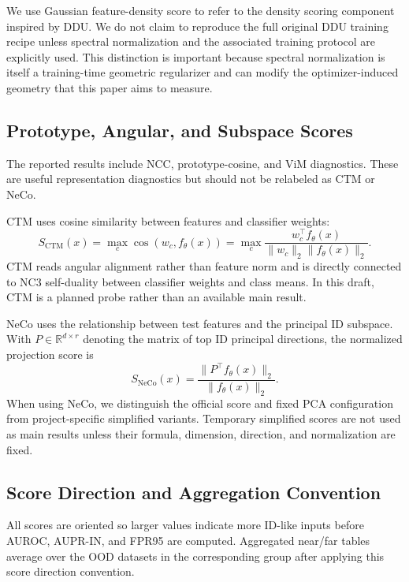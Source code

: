 We use Gaussian feature-density score to refer to the density scoring component
inspired by DDU. We do not claim to reproduce
the full original DDU training recipe unless spectral normalization and the
associated training protocol are explicitly used. This distinction is important
because spectral normalization is itself a training-time geometric regularizer
and can modify the optimizer-induced geometry that this paper aims to measure.

\subsection{Prototype, Angular, and Subspace Scores}
\label{app:prototype-angular-subspace-scores}

The reported results include NCC, prototype-cosine, and ViM diagnostics.
These are useful representation diagnostics but should not be relabeled as CTM
or NeCo.

CTM uses cosine similarity between features and classifier weights:
\[
    S_{\mathrm{CTM}}(x)
    =
    \max_c \cos(w_c,f_\theta(x))
    =
    \max_c
    \frac{w_c^\top f_\theta(x)}
    {\|w_c\|_2\|f_\theta(x)\|_2}.
\]
CTM reads angular alignment rather than feature norm and is directly connected
to NC3 self-duality between classifier weights and class means. In this
draft, CTM is a planned probe rather than an available main result.

NeCo uses the relationship between test features and the principal ID subspace.
With \(P\in\mathbb{R}^{d\times r}\) denoting the matrix of top ID principal
directions, the normalized projection score is
\[
    S_{\mathrm{NeCo}}(x)
    =
    \frac{\|P^\top f_\theta(x)\|_2}
    {\|f_\theta(x)\|_2}.
\]
When using NeCo, we distinguish the official score and fixed PCA configuration
from project-specific simplified variants. Temporary simplified scores are not
used as main results unless their formula, dimension, direction, and
normalization are fixed.

\subsection{Score Direction and Aggregation Convention}
\label{app:score-direction-aggregation}

All scores are oriented so larger values indicate more ID-like inputs before
AUROC, AUPR-IN, and FPR95 are computed. Aggregated near/far tables average over
the OOD datasets in the corresponding group after applying this score direction
convention.
